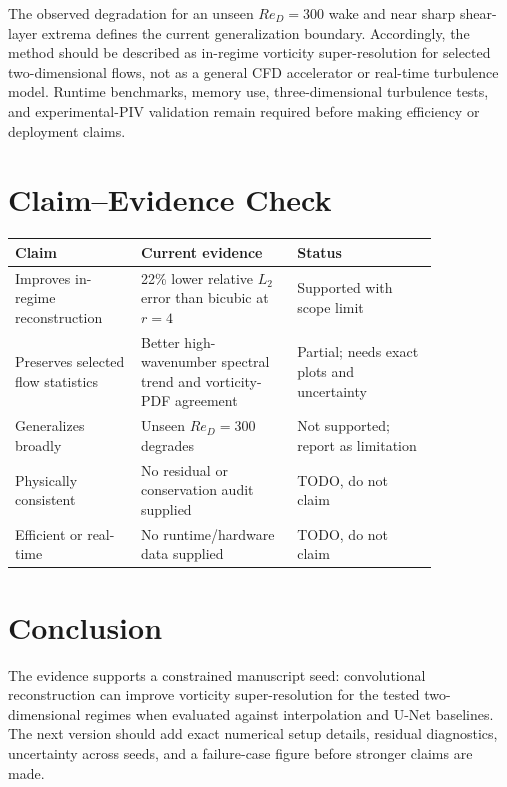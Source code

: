 \documentclass[11pt]{article}
\begin{document}
The observed degradation for an unseen $Re_D=300$ wake and near sharp shear-layer extrema defines the current generalization boundary. Accordingly, the method should be described as in-regime vorticity super-resolution for selected two-dimensional flows, not as a general CFD accelerator or real-time turbulence model. Runtime benchmarks, memory use, three-dimensional turbulence tests, and experimental-PIV validation remain required before making efficiency or deployment claims.

\section{Claim--Evidence Check}
\begin{center}
\begin{tabular}{p{0.25\linewidth}p{0.31\linewidth}p{0.28\linewidth}}
\toprule
Claim & Current evidence & Status \\
\midrule
Improves in-regime reconstruction & 22\% lower relative $L_2$ error than bicubic at $r=4$ & Supported with scope limit \\
Preserves selected flow statistics & Better high-wavenumber spectral trend and vorticity-PDF agreement & Partial; needs exact plots and uncertainty \\
Generalizes broadly & Unseen $Re_D=300$ degrades & Not supported; report as limitation \\
Physically consistent & No residual or conservation audit supplied & TODO, do not claim \\
Efficient or real-time & No runtime/hardware data supplied & TODO, do not claim \\
\bottomrule
\end{tabular}
\end{center}

\section{Conclusion}
The evidence supports a constrained manuscript seed: convolutional reconstruction can improve vorticity super-resolution for the tested two-dimensional regimes when evaluated against interpolation and U-Net baselines. The next version should add exact numerical setup details, residual diagnostics, uncertainty across seeds, and a failure-case figure before stronger claims are made.
\end{document}
